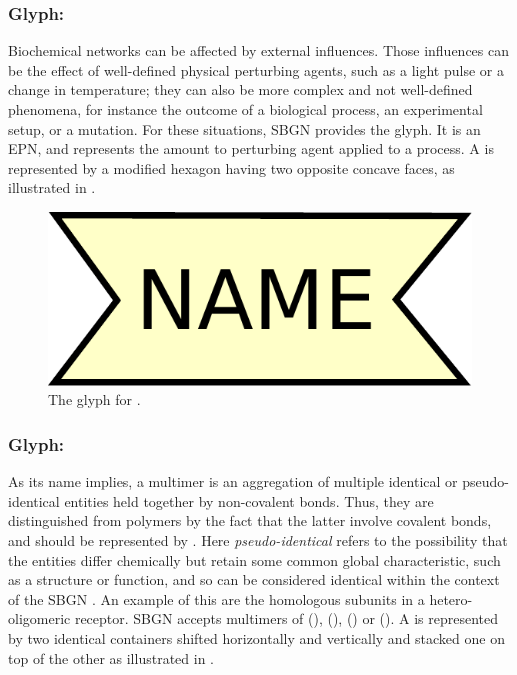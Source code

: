 \subsubsection{Glyph: }
\label{sec:perturbing agent}
 
Biochemical networks can be affected by external influences.  Those
influences can be the effect of well-defined physical perturbing agents, such as a light
pulse or a change in temperature; they can also be more complex and not
well-defined phenomena, for instance the outcome of a biological process, an experimental
setup, or a mutation.  For these situations, SBGN provides the
 glyph. It is an EPN, and represents the amount to perturbing agent applied to a process. A  is represented by a modified hexagon
having two opposite concave faces, as illustrated in .

\begin{figure}[htb]
  \centering
  \includegraphics[scale = 0.3]{le_images/perturbing_agent}
  \caption{The \PD glyph for .}
  \label{fig:perturbing agent}
\end{figure}

\subsubsection{Glyph: }
\label{sec:multimer}

As its name implies, a multimer is an aggregation of multiple identical or pseudo-identical entities held together by non-covalent bonds. Thus, they are distinguished from polymers by the fact that the latter involve covalent bonds, and should be represented by . Here \emph{pseudo-identical} refers to the possibility that the entities differ chemically but retain some common global characteristic, such as a structure or function, and so can be considered identical within the context of the SBGN \PD.  An example of this are the homologous subunits in a hetero-oligomeric receptor. SBGN \PD accepts multimers of  (),  (),  () or  (). A  is represented by two identical containers shifted horizontally and vertically and stacked one on top of the other as illustrated in .

